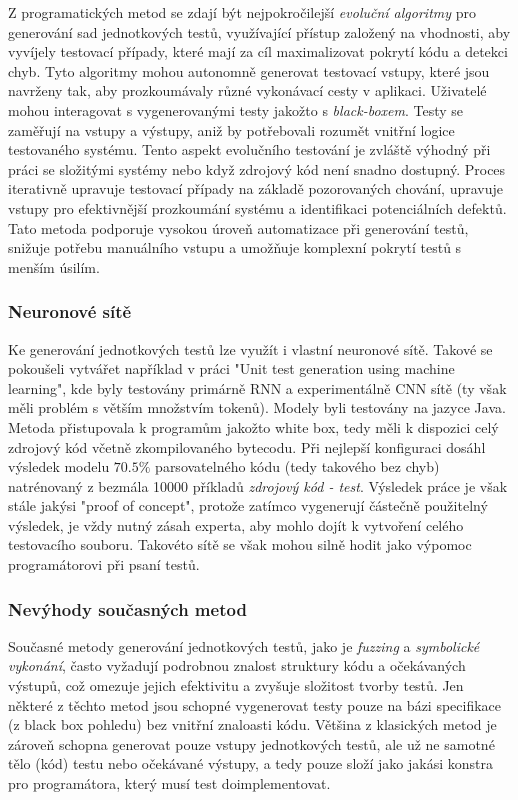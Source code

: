 \documentclass[czech, ma, kiv, he, iso690alph, pdf, viewonly]{fasthesis}
\begin{document}
        Z programatických metod se zdají být nejpokročilejší \emph{evoluční algoritmy} pro generování sad jednotkových testů, využívající přístup založený na vhodnosti, aby vyvíjely testovací případy, které mají za cíl maximalizovat pokrytí kódu a detekci chyb. Tyto algoritmy mohou autonomně generovat testovací vstupy, které jsou navrženy tak, aby prozkoumávaly různé vykonávací cesty v aplikaci. Uživatelé mohou interagovat s vygenerovanými testy jakožto s \textit{black-boxem}. Testy se zaměřují na vstupy a výstupy, aniž by potřebovali rozumět vnitřní logice testovaného systému. Tento aspekt evolučního testování je zvláště výhodný při práci se složitými systémy nebo když zdrojový kód není snadno dostupný. Proces iterativně upravuje testovací případy na základě pozorovaných chování, upravuje vstupy pro efektivnější prozkoumání systému a identifikaci potenciálních defektů. Tato metoda podporuje vysokou úroveň automatizace při generování testů, snižuje potřebu manuálního vstupu a umožňuje komplexní pokrytí testů s menším úsilím. \cite{CAMPOS2018207} \cite{abs-2111-05003}

        \subsubsection{Neuronové sítě}
        Ke generování jednotkových testů lze využít i vlastní neuronové sítě. Takové se pokoušeli vytvářet například v práci "Unit test generation using machine learning"\cite{Saes2018UnitTestGeneration}, kde byly testovány primárně RNN a experimentálně CNN sítě (ty však měli problém s větším množstvím tokenů). Modely byli testovány na jazyce Java. Metoda přistupovala k programům jakožto white box, tedy měli k dispozici celý zdrojový kód včetně zkompilovaného bytecodu. Při nejlepší konfiguraci dosáhl výsledek modelu \(70.5\%\) parsovatelného kódu (tedy takového bez chyb) natrénovaný z bezmála 10000 příkladů \textit{zdrojový kód - test}. Výsledek práce je však stále jakýsi "proof of concept", protože zatímco vygenerují částečně použitelný výsledek, je vždy nutný zásah experta, aby mohlo dojít k vytvoření celého testovacího souboru. Takovéto sítě se však mohou silně hodit jako výpomoc programátorovi při psaní testů.

        \subsubsection{Nevýhody současných metod}
        Současné metody generování jednotkových testů, jako je \textit{fuzzing} a \textit{symbolické vykonání}, často vyžadují podrobnou znalost struktury kódu a očekávaných výstupů, což omezuje jejich efektivitu a zvyšuje složitost tvorby testů. Jen některé z těchto metod jsou schopné vygenerovat testy pouze na bázi specifikace (z black box pohledu) bez vnitřní znaloasti kódu. Většina z klasických metod je zároveň schopna generovat pouze vstupy jednotkových testů, ale už ne samotné tělo (kód) testu nebo očekávané výstupy, a tedy pouze složí jako jakási konstra pro programátora, který musí test doimplementovat.
\end{document}
